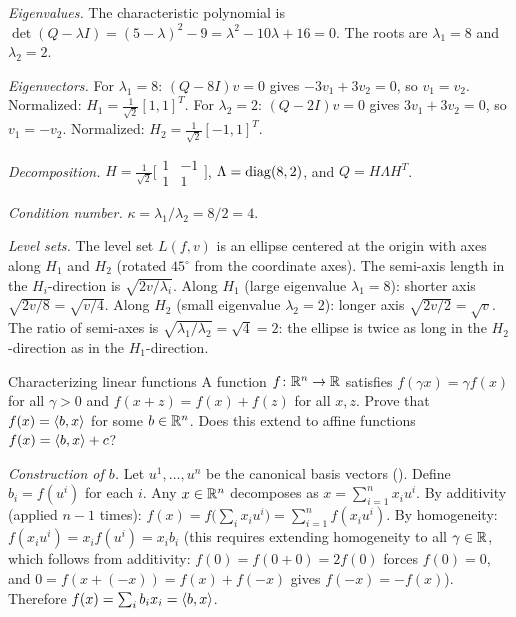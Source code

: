 \solution
\textit{Eigenvalues.}
The characteristic polynomial is $\det(Q - \lambda I) = (5 - \lambda)^2 - 9 = \lambda^2 - 10\lambda + 16 = 0$.
The roots are $\lambda_1 = 8$ and $\lambda_2 = 2$.

\textit{Eigenvectors.}
For $\lambda_1 = 8$: $(Q - 8I)v = 0$ gives $-3v_1 + 3v_2 = 0$, so $v_1 = v_2$.
Normalized: $H_1 = \frac{1}{\sqrt{2}}[1, 1]^T$.
For $\lambda_2 = 2$: $(Q - 2I)v = 0$ gives $3v_1 + 3v_2 = 0$, so $v_1 = -v_2$.
Normalized: $H_2 = \frac{1}{\sqrt{2}}[-1, 1]^T$.

\textit{Decomposition.}
$H = \frac{1}{\sqrt{2}}\bigl[\begin{smallmatrix} 1 & -1 \\ 1 & 1 \end{smallmatrix}\bigr]$, $\Lambda = \operatorname{diag}(8, 2)$, and $Q = H\Lambda H^T$.

\textit{Condition number.}
$\kappa = \lambda_1 / \lambda_2 = 8/2 = 4$.

\textit{Level sets.}
The level set $L(f, v)$ is an ellipse centered at the origin with axes along $H_1$ and $H_2$ (rotated $45^\circ$ from the coordinate axes).
The semi-axis length in the $H_i$-direction is $\sqrt{2v / \lambda_i}$.
Along $H_1$ (large eigenvalue $\lambda_1 = 8$): shorter axis $\sqrt{2v/8} = \sqrt{v/4}$.
Along $H_2$ (small eigenvalue $\lambda_2 = 2$): longer axis $\sqrt{2v/2} = \sqrt{v}$.
The ratio of semi-axes is $\sqrt{\lambda_1/\lambda_2} = \sqrt{4} = 2$: the ellipse is twice as long in the $H_2$-direction as in the $H_1$-direction.

\begin{exercise}{Characterizing linear functions}\label{ex:linear-characterization}
	A function $f \colon \mathbb{R}^n \to \mathbb{R}$ satisfies $f(\gamma x) = \gamma f(x)$ for all $\gamma > 0$ and $f(x + z) = f(x) + f(z)$ for all $x, z$.
	Prove that $f(x) = \langle b, x\rangle$ for some $b \in \mathbb{R}^n$.
	Does this extend to affine functions $f(x) = \langle b, x\rangle + c$?
\end{exercise}

\solution
\textit{Construction of $b$.}
Let $u^1, \dots, u^n$ be the canonical basis vectors ().
Define $b_i = f(u^i)$ for each $i$.
Any $x \in \mathbb{R}^n$ decomposes as $x = \sum_{i=1}^n x_i u^i$.
By additivity (applied $n - 1$ times):
$f(x) = f\bigl(\sum_i x_i u^i\bigr) = \sum_{i=1}^n f(x_i u^i)$.
By homogeneity: $f(x_i u^i) = x_i f(u^i) = x_i b_i$ (this requires extending homogeneity to all $\gamma \in \mathbb{R}$, which follows from additivity: $f(0) = f(0 + 0) = 2f(0)$ forces $f(0) = 0$, and $0 = f(x + (-x)) = f(x) + f(-x)$ gives $f(-x) = -f(x)$).
Therefore $f(x) = \sum_i b_i x_i = \langle b, x\rangle$.

